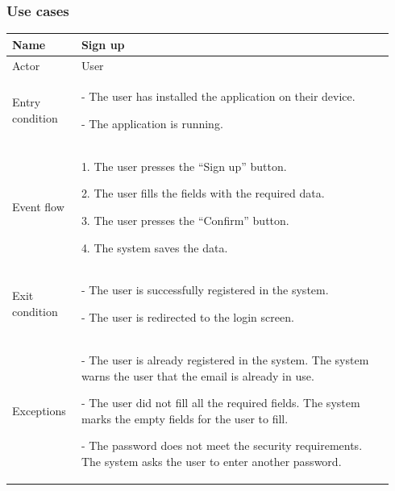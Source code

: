 \subsubsection{Use cases}

\begin{table}[H]
\begin{tabular}{|p{0.17\linewidth}|p{0.77\linewidth}|}
\hline
Name            & Sign up
\\ \hline

Actor           & User
\\ \hline

Entry condition &
- The user has installed the application on their device.

- The application is running.
\\ \hline
Event flow      & 
    1. The user presses the “Sign up” button.

    2. The user fills the fields with the required data.

    3. The user presses the “Confirm” button.

    4. The system saves the data.
\\ \hline
Exit condition  & 
 - The user is successfully registered in the system.

 - The user is redirected to the login screen.
\\ \hline
Exceptions      &
    - The user is already registered in the system. The system warns the user that the email is already in use. 

    - The user did not fill all the required fields. The system marks the empty fields for the user to fill.

    - The password does not meet the security requirements. The system asks the user to enter another password.
\\ \hline
\end{tabular}
\end{table}

